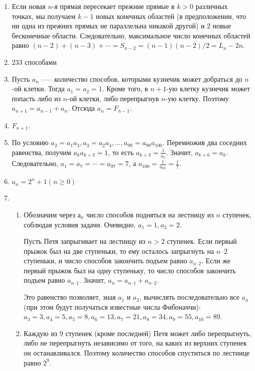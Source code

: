 \documentclass[14pt,openany]{book}
\begin{document}
\begin{enumerate}
\item Если новая $n$-я прямая пересекает прежние прямые в $k>0$ различных точках,
мы получаем $k-1$ новых конечных областей (в предположении, что ни одна из прежних прямых
не параллельна никакой другой) и $2$ новые бесконечные области. Следовательно, максимальное
число конечных областей равно $(n-2) + (n-3) + \cdots = S_{n-2} = (n-1)(n-2)/2 = L_n-2n$.

\item 233 способами

\item Пусть $a_n$ --— количество способов, которыми кузнечик может добраться до $n$-ой клетки. Тогда $a_1 = a_2 = 1$. Кроме того, в $n+1$-ую клетку кузнечик может попасть либо из $n$-ой клетки, либо перепрыгнув $n$-ую клетку. Поэтому $a_{n + 1} = a_{n - 1} + a_n$. Отсюда $a_n = F_{n - 1}$. 

\item $F_{n + 1}$.

\item По условию  $a_2 = a_1a_3, a_3 = a_2a_4, \ldots, a_{99} = a_{98}a_{100}$.
      Перемножив два соседних равенства, получим $a_ka_{k+3} = 1$,  то есть 
      $a_{k+3} = \frac{1}{a_k}$. Значит, $a_{k+6} = a_k$. 
      Следовательно, $a_1 = a_7 = \cdots = a_{97} = 7$,
      а $a_{100} = \frac{1}{a_{97}} = \frac{1}{7}$.

\item $a_n = 2^n + 1 (n \ge 0)$

\item \begin{enumerate}
    \item Обозначим через $а_n$ число способов подняться на лестницу из $n$ ступенек, соблюдая условия задачи. Очевидно,  $a_1 = 1,  a_2 = 2$.
    
   Пусть Петя запрыгивает на лестницу из $n > 2$  ступенек. Если первый прыжок был на две ступеньки, то ему осталось запрыгнуть на  $n – 2$  ступеньки, и число способов закончить подъем равно $a_{n–2}$. Если же первый прыжок был на одну ступеньку, то число способов закончить подъем равно $a_{n–1}$. Значит, $a_n = a_{n–1} + a_{n–2}$.

   Это равенство позволяет, зная $a_1$ и $a_2$, вычислять последовательно все $a_n$ (при этом будут получаться известные числа Фибоначчи):
$a_3 = 3,  a_4 = 5,  a_5 = 8,  a_6 = 13,  a_7 = 21,  a_8 = 34,  a_9 = 55,  a_{10} = 89$.

   \item Каждую  из $9$ ступенек (кроме последней) Петя может либо перепрыгнуть, либо не перепрыгнуть независимо от того, на каких из верхних ступенек он останавливался. Поэтому количество способов спуститься по лестнице равно $2^9$.


\end{enumerate}
\end{enumerate}
\end{document}
